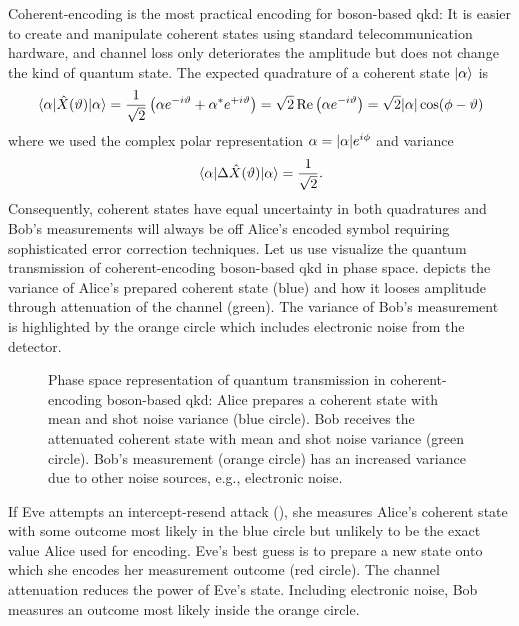 Coherent-encoding is the most practical encoding for boson-based \gls{qkd}:
It is easier to create and manipulate coherent states using standard telecommunication hardware, and channel loss only deteriorates the amplitude but does not change the kind of quantum state.
The expected quadrature of a coherent state $\ket{\alpha}$ is
\begin{equation}
	\expval{\hat{X}(\vartheta)}{\alpha}
	=
	\frac{1}{\sqrt{2}}
	\left(
		\alpha
		e^{-i\vartheta}
		+
		\alpha^*
		e^{+i\vartheta}
	\right)
	=
	\sqrt{2}
	\operatorname{\operatorname{Re}}\left(
		\alpha
		e^{-i\vartheta}
	\right)
	=
	\sqrt{2}
	\abs{\alpha}
	\cos(\phi-\vartheta)
\end{equation}
where we used the complex polar representation $\alpha=\abs{\alpha}e^{i\phi}$ and variance~\cite[p.~59]{Barnett2002}
\begin{equation}
	\expval{\Delta\hat{X}(\vartheta)}{\alpha}
	=
	\frac{1}{\sqrt{2}}
	.
\end{equation}
Consequently, coherent states have equal uncertainty in both quadratures and Bob's measurements will always be off Alice's encoded symbol requiring sophisticated error correction techniques.
Let us use visualize the quantum transmission of coherent-encoding boson-based \gls{qkd} in phase space.
 depicts the variance of Alice's prepared coherent state (blue) and how it looses amplitude through attenuation of the channel (green).
The variance of Bob's measurement is highlighted by the orange circle which includes electronic noise from the detector.
\begin{figure}[htb]
	\centering
	
	\caption{Phase space representation of quantum transmission in coherent-encoding boson-based \gls{qkd}: Alice prepares a coherent state with mean and shot noise variance (blue circle). Bob receives the attenuated coherent state with mean and shot noise variance (green circle). Bob's measurement (orange circle) has an increased variance due to other noise sources, e.g., electronic noise.}\label{fig:phase_space_coherent}
\end{figure}
If Eve attempts an intercept-resend attack (), she measures Alice's coherent state with some outcome most likely in the blue circle but unlikely to be the exact value Alice used for encoding.
Eve's best guess is to prepare a new state onto which she encodes her measurement outcome (red circle).
The channel attenuation reduces the power of Eve's state.
Including electronic noise, Bob measures an outcome most likely inside the orange circle.
